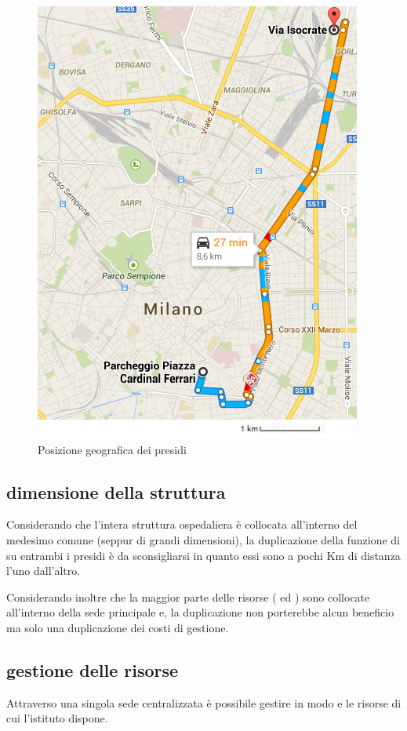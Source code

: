 \begin{figure}[htbp]
\centering
\includegraphics[scale=0.6]{Images/maps.png}
\caption{Posizione geografica dei presidi}
\label{sd-structure-maps}
\end{figure}

\subsection[Dimensione della struttura]{dimensione della struttura}
\label{sd-structure-size}
Considerando che l'intera struttura ospedaliera è collocata all'interno del medesimo comune (seppur di grandi dimensioni), la duplicazione della funzione di  su entrambi i presidi è da sconsigliarsi in quanto essi sono a pochi Km di distanza l'uno dall'altro.

Considerando inoltre che la maggior parte delle risorse ( ed ) sono collocate all'interno della sede principale e, la duplicazione non porterebbe alcun beneficio ma solo una duplicazione dei costi di gestione.

\subsection[Gestione delle risorse]{gestione delle risorse}
\label{sd-structure-resource-management}
Attraverso una singola sede centralizzata è possibile gestire in modo  e  le risorse di cui l'istituto dispone.

